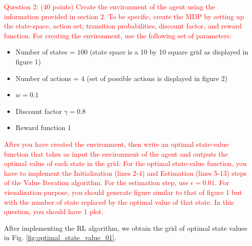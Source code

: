 \documentclass[11pt]{article}
\begin{document}
\textcolor{red}{Question 2: (40 points) Create the environment of the agent using the information provided in section 2. To be specific, create the MDP by setting up the state-space, action set, transition probabilities, discount factor, and reward
function. For creating the environment, use the following set of parameters:}
\begin{itemize}
 \item Number of states = $100$ (state space is a 10 by 10 square grid as displayed
in figure 1)
\item Number of actions = $4$ (set of possible actions is displayed in figure 2)
\item $w = 0.1$
\item Discount factor $\gamma = 0.8$
\item Reward function $1$
\end{itemize}
\textcolor{red}{
    After you have created the environment, then write an optimal state-value function that takes as input the environment of the agent and outputs the optimal value of each state in the grid. For the optimal state-value function, you have to implement the Initialization (lines 2-4) and Estimation (lines 5-13) steps of the Value Iteration algorithm. For the estimation step, use $\epsilon=0.01$. For visualization purpose, you should generate figure similar to that of figure 1 but with the number of state replaced by the optimal value of that state. In this question, you should have 1 plot.
}

After implementing the RL algorithm, we obtain the grid of optimal state values in Fig. \ref{fig:optimal_state_value_01}.
\end{document}
